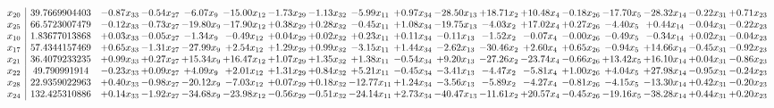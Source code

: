 \documentclass[9pt]{article}
\begin{document}
 \[\begin{array}{c| c c@{\hskip 2pt} c@{\hskip 2pt} c@{\hskip 2pt} c@{\hskip 2pt} c@{\hskip 2pt} c@{\hskip 2pt} c@{\hskip 2pt} c@{\hskip 2pt} c@{\hskip 2pt} c@{\hskip 2pt} c@{\hskip 2pt} c@{\hskip 2pt} c@{\hskip 2pt} c@{\hskip 2pt} c@{\hskip 2pt} c@{\hskip 2pt} }
 x_{20}   &  39.7669904403 & -0.87 x_{33} & -0.54 x_{27} & -6.07 x_{9} & -15.00 x_{12} & -1.73 x_{29} & -1.13 x_{32} & -5.99 x_{11} & +  0.97 x_{34} & -28.50 x_{13} & + 18.71 x_{2} & + 10.48 x_{4} & -0.18 x_{26} & -17.70 x_{5} & -28.32 x_{14} & -0.22 x_{31} & +  0.71 x_{23}\\
 x_{25}   &  66.5723007479 & -0.12 x_{33} & -0.73 x_{27} & -19.80 x_{9} & -17.90 x_{12} & +  0.38 x_{29} & +  0.28 x_{32} & -0.45 x_{11} & +  1.08 x_{34} & -19.75 x_{13} & -4.03 x_{2} & + 17.02 x_{4} & +  0.27 x_{26} & -4.40 x_{5} & +  0.44 x_{14} & -0.04 x_{31} & -0.22 x_{23}\\
 x_{10}   &  1.83677013868 & +  0.03 x_{33} & -0.05 x_{27} & -1.34 x_{9} & -0.49 x_{12} & +  0.04 x_{29} & +  0.02 x_{32} & +  0.23 x_{11} & +  0.11 x_{34} & -0.11 x_{13} & -1.52 x_{2} & -0.07 x_{4} & -0.00 x_{26} & -0.49 x_{5} & -0.34 x_{14} & +  0.02 x_{31} & -0.04 x_{23}\\
 x_{17}   &  57.4344157469 & +  0.65 x_{33} & -1.31 x_{27} & -27.99 x_{9} & +  2.54 x_{12} & +  1.29 x_{29} & +  0.99 x_{32} & -3.15 x_{11} & +  1.44 x_{34} & -2.62 x_{13} & -30.46 x_{2} & +  2.60 x_{4} & +  0.65 x_{26} & -0.94 x_{5} & + 14.66 x_{14} & -0.45 x_{31} & -0.92 x_{23}\\
 x_{21}   &  36.4079233235 & +  0.99 x_{33} & +  0.27 x_{27} & + 15.34 x_{9} & + 16.47 x_{12} & +  1.07 x_{29} & +  1.35 x_{32} & +  1.38 x_{11} & -0.54 x_{34} & +  9.20 x_{13} & -27.26 x_{2} & -23.74 x_{4} & -0.66 x_{26} & + 13.42 x_{5} & + 16.10 x_{14} & +  0.04 x_{31} & -0.86 x_{23}\\
 x_{22}   &  49.790991914 & -0.23 x_{33} & +  0.09 x_{27} & +  4.09 x_{9} & +  2.01 x_{12} & +  1.31 x_{29} & +  0.84 x_{32} & +  5.21 x_{11} & -0.45 x_{34} & -3.41 x_{13} & -4.47 x_{2} & -5.81 x_{4} & +  1.00 x_{26} & +  4.04 x_{5} & + 27.98 x_{14} & -0.95 x_{31} & -0.24 x_{23}\\
 x_{28}   &  22.9359022963 & +  0.40 x_{33} & -0.98 x_{27} & -20.12 x_{9} & -7.03 x_{12} & +  0.07 x_{29} & +  0.18 x_{32} & -12.77 x_{11} & +  1.24 x_{34} & -3.56 x_{13} & -5.89 x_{2} & -4.27 x_{4} & -0.81 x_{26} & -4.15 x_{5} & -13.30 x_{14} & +  0.42 x_{31} & -0.20 x_{23}\\
 x_{24}   &  132.425310886 & +  0.14 x_{33} & -1.92 x_{27} & -34.68 x_{9} & -23.98 x_{12} & -0.56 x_{29} & -0.51 x_{32} & -24.14 x_{11} & +  2.73 x_{34} & -40.47 x_{13} & -11.61 x_{2} & + 20.57 x_{4} & -0.45 x_{26} & -19.16 x_{5} & -38.28 x_{14} & +  0.44 x_{31} & +  0.20 x_{23}\\

\end{array}\]
\end{document}
